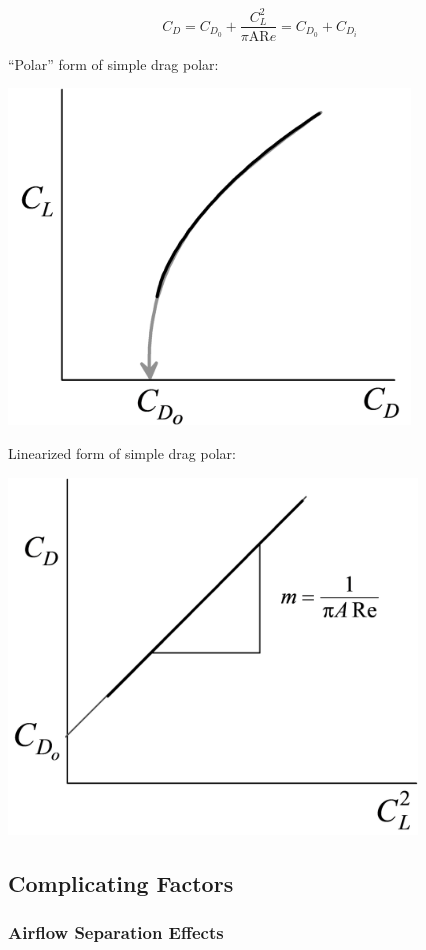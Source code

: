 \documentclass[
]{book}
\begin{document}
\[C_D = C_{D_0} + \frac{C_L^2}{\pi \mathrm{AR} e} = C_{D_0} + C_{D_i}\]

``Polar'' form of simple drag polar:

\includegraphics[width=4.203in,height=3.513in]{media/05/image73.svg}

Linearized form of simple drag polar:

\includegraphics[width=4.272in,height=3.725in]{media/05/image75.svg}

\hypertarget{complicating-factors}{%
\subsection{Complicating Factors}\label{complicating-factors}}

\hypertarget{airflow-separation-effects}{%
\subsubsection*{Airflow Separation Effects}\label{airflow-separation-effects}}
\end{document}
